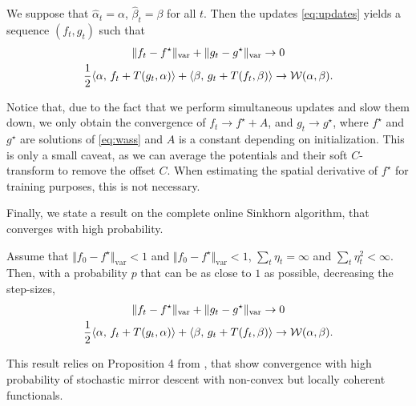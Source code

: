 \begin{proposition}\label{eq:deterministic}
    We suppose that $\hat \alpha_t = \alpha$, $\hat \beta_t = \beta$ for all
    $t$. Then the updates \eqref{eq:updates} yields a sequence $(f_t, g_t)$ such
    that 
    \begin{gather}
        \Vert f_t - f^\star \Vert_{\text{var}} 
        + \Vert g_t - g^\star \Vert_{\text{var}} \to 0 \\
        \frac{1}{2} \langle \alpha,\,f_t + T(g_t, \alpha)\rangle + \langle \beta,\,g_t + T(f_t, \beta)\rangle 
         \to \mathcal{W}(\alpha, \beta).
    \end{gather}
\end{proposition}
Notice that, due to the fact that we perform simultaneous updates and slow them
down, we only obtain the convergence of $f_t \to f^\star + A$, and $g_t \to
g^\star$, where $f^\star$ and $g^\star$ are solutions of \eqref{eq:wass} and $A$
is a constant depending on initialization. This is only a small caveat, as we
can average the potentials and their soft $C$-transform to remove the offset
$C$. When estimating the spatial derivative of $f^\star$ for training purposes, this is not necessary.

Finally, we state a result on the complete online Sinkhorn algorithm, that
converges with high probability.
% 
\begin{proposition}
    Assume that $\Vert f_0 - f^\star \Vert_{\text{var}} < 1$ and $\Vert f_0 -
    f^\star \Vert_{\text{var}} < 1$, $\sum_t \eta_t = \infty$ and $\sum_t
    \eta_t^2 < \infty$. Then, with a probability $p$ that can be as close to $1$
    as possible, decreasing the step-sizes,
    \begin{gather}
        \Vert f_t - f^\star \Vert_{\text{var}} + \Vert g_t - 
        g^\star \Vert_{\text{var}} \to 0 \\
        \frac{1}{2} \langle \alpha,\,f_t + T(g_t, \alpha)\rangle + \langle \beta,\,g_t + T(f_t, \beta)\rangle 
        \to \mathcal{W}(\alpha, \beta).
    \end{gather}
\end{proposition}
% 
This result relies on Proposition 4 from \cite{}, that show convergence with
high probability of stochastic mirror descent with non-convex but locally
coherent functionals.

